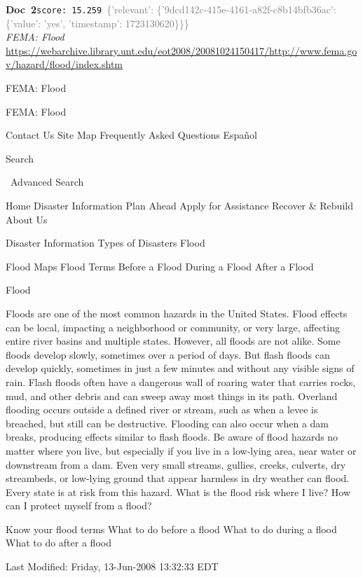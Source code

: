 \documentclass[a4paper,11pt]{article}
\begin{document}
\begin{docenv}
{\footnotesize\textcolor{doccolor}{\textbf{Doc~2}}}\hfill{\tiny\texttt{score:~15.259}}\ {\tiny\textcolor{gray}{\{'relevant': \{'9dcd142c-415e-4161-a82f-c8b14bfb36ac': \{'value': 'yes', 'timestamp': 1723130620\}\}\}}}\\[3pt]
{\small\textit{FEMA: Flood}}\\[2pt]
{\tiny\url{https://webarchive.library.unt.edu/eot2008/20081024150417/http://www.fema.gov/hazard/flood/index.shtm}}\\[4pt]
{\footnotesize FEMA: Flood


FEMA: Flood

Contact Us
Site Map
Frequently Asked Questions
Español

Search

 Advanced Search

Home
Disaster Information
Plan Ahead
Apply for Assistance
Recover \& Rebuild
About Us

Disaster Information
Types of Disasters
Flood

Flood Maps
Flood Terms
Before a Flood
During a Flood
After a Flood

Flood

Floods are one of the most common hazards in the United States. Flood effects can be local, impacting a neighborhood or community, or very large, affecting entire river basins and multiple states.
However, all floods are not alike. Some floods develop slowly, sometimes over a period of days. But flash floods can develop quickly, sometimes in just a few minutes and without any visible signs of rain. Flash floods often have a dangerous wall of roaring water that carries rocks, mud, and other debris and can sweep away most things in its path. Overland flooding occurs outside a defined river or stream, such as when a levee is breached, but still can be destructive. Flooding can also occur when a dam breaks, producing effects similar to flash floods.
Be aware of flood hazards no matter where you live, but especially if you live in a low-lying area, near water or downstream from a dam. Even very small streams, gullies, creeks, culverts, dry streambeds, or low-lying ground that appear harmless in dry weather can flood. Every state is at risk from this hazard.
What is the flood risk where I live?
How can I protect myself from a flood?

Know your flood terms
What to do before a flood
What to do during a flood
What to do after a flood

Last Modified: Friday, 13-Jun-2008 13:32:33 EDT

}
\end{docenv}
\end{document}
